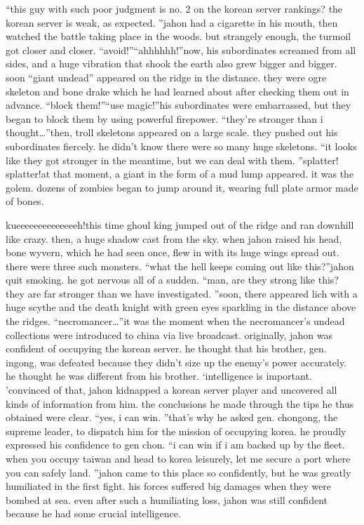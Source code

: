 “this guy with such poor judgment is no.
 2 on the korean server rankings? the korean server is weak, as expected.
”jahon had a cigarette in his mouth, then watched the battle taking place in the woods.
but strangely enough, the turmoil got closer and closer.
“avoid!”“ahhhhhh!”now, his subordinates screamed from all sides, and a huge vibration that shook the earth also grew bigger and bigger.
 soon “giant undead” appeared on the ridge in the distance.
 they were ogre skeleton and bone drake which he had learned about after checking them out in advance.
“block them!”“use magic!”his subordinates were embarrassed, but they began to block them by using powerful firepower.
“they’re stronger than i thought…”then, troll skeletons appeared on a large scale.
 they pushed out his subordinates fiercely.
 he didn’t know there were so many huge skeletons.
“it looks like they got stronger in the meantime, but we can deal with them.
”splatter! splatter!at that moment, a giant in the form of a mud lump appeared.
 it was the golem.
dozens of zombies began to jump around it, wearing full plate armor made of bones.


kueeeeeeeeeeeeeeh!this time ghoul king jumped out of the ridge and ran downhill like crazy.
then, a huge shadow cast from the sky.
 when jahon raised his head, bone wyvern, which he had seen once, flew in with its huge wings spread out.
 there were three such monsters.
“what the hell keeps coming out like this?”jahon quit smoking.
 he got nervous all of a sudden.
“man, are they strong like this? they are far stronger than we have investigated.
”soon, there appeared lich with a huge scythe and the death knight with green eyes sparkling in the distance above the ridges.
“necromancer…”it was the moment when the necromancer’s undead collections were introduced to china via live broadcast.
originally, jahon was confident of occupying the korean server.
 he thought that his brother, gen.
 ingong, was defeated because they didn’t size up the enemy’s power accurately.
 he thought he was different from his brother.
‘intelligence is important.
’convinced of that, jahon kidnapped a korean server player and uncovered all kinds of information from him.
 the conclusions he made through the tips he thus obtained were clear.
“yes, i can win.
”that’s why he asked gen.
 chongong, the supreme leader, to dispatch him for the mission of occupying korea.
 he proudly expressed his confidence to gen chon.
“i can win if i am backed up by the fleet.
 when you occupy taiwan and head to korea leisurely, let me secure a port where you can safely land.
”jahon came to this place so confidently, but he was greatly humiliated in the first fight.
 his forces suffered big damages when they were bombed at sea.
even after such a humiliating loss, jahon was still confident because he had some crucial intelligence.


 
